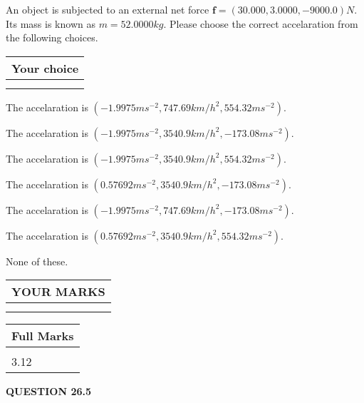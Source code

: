 \documentclass[12pt]{article}
\begin{document}
  
 
An object is subjected to an external net force $\mathbf{f}=(
30.000 ,
3.0000,
-9000.0  )N$. Its mass is known as
$m= %
52.0000  kg$. Please choose the correct accelaration
from the following choices.
 
  
  
\noindent\hspace{3.0in} \begin{tabular}{|l|}
\hline
Your choice \\
\hline
 \\ 
 \\ 
\hline
\end{tabular}
  
  
 
 
The accelaration is
$(
-1.9975ms^{-2},
747.69km/h^2,
554.32ms^{-2}
).
$
 
 
The accelaration is
$(
-1.9975ms^{-2},
3540.9km/h^2,
-173.08ms^{-2}
).
$
 
 
The accelaration is
$(
-1.9975ms^{-2},
3540.9km/h^2,
554.32ms^{-2}
).
$
 
 
The accelaration is
$(
0.57692ms^{-2},
3540.9km/h^2,
-173.08ms^{-2}
).
$
 
 
The accelaration is
$(
-1.9975ms^{-2},
747.69km/h^2,
-173.08ms^{-2}
).
$
 
 
The accelaration is
$(
0.57692ms^{-2},
3540.9km/h^2,
554.32ms^{-2}
).
$
 
 
 None of these.
 
 
 
 

 
\vspace{0.3in}
  
\vspace{0.2in}
  
\noindent\begin{tabular}{|l|}
\hline
 YOUR MARKS  \\
\hline
 \\ 
 \\ 
\hline
\end{tabular}
\hspace{0.05in} \begin{tabular}{|l|}
\hline
 Full Marks  \\
\hline
 \\ 
3.12 \\
\hline
\end{tabular}
{\textbf{\Large{QUESTION
26.5 
}}}
  
\end{document}
